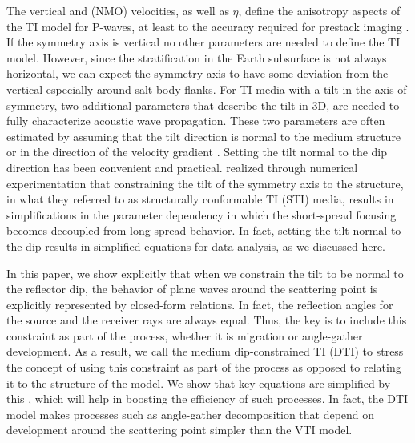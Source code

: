 The vertical and  (NMO) velocities, as well as  $\eta$, define the anisotropy aspects of the TI model for P-waves, at least to the accuracy required for prestack imaging \cite[]{GEO60-05-15501566}.  If the symmetry axis is vertical no other parameters are needed to define the TI model.  However, since the stratification in the Earth subsurface is not always horizontal, we can expect the symmetry axis to have some deviation from the vertical especially around salt-body flanks.  For TI media with a tilt in the axis of symmetry, two additional parameters that describe the tilt in 3D, are needed to fully characterize acoustic wave propagation.  These two parameters are often estimated by assuming that the tilt direction is normal to the medium structure or in the direction of the velocity gradient \cite[]{SEG-2000-09650968,audebert:P185}.  Setting the tilt normal to the dip direction has been convenient and practical. \cite{audebert:P185} realized through numerical experimentation that constraining the tilt of the symmetry axis to the structure, in what they referred to as structurally conformable TI (STI) media, results in simplifications in the parameter dependency in which the short-spread focusing becomes decoupled from long-spread behavior. In fact, setting the tilt normal to the dip results in simplified equations for data analysis, as we discussed here.

In this paper, we show explicitly that when we constrain the tilt to be normal to the reflector dip, the behavior of plane waves around the scattering point is explicitly represented by closed-form relations. In fact, the reflection angles for the source and the receiver rays are always equal. Thus, the key is to include this constraint as part of the process, whether it is migration or angle-gather development.  As a result, we call the medium dip-constrained TI (DTI) to stress the concept of using this constraint as part of the process as opposed to relating it to the structure of the model. We show that key equations are simplified by this  , which will help in boosting the efficiency of such processes.  In fact, the DTI model makes processes such as angle-gather decomposition that depend on development around the scattering point simpler than the VTI model.

